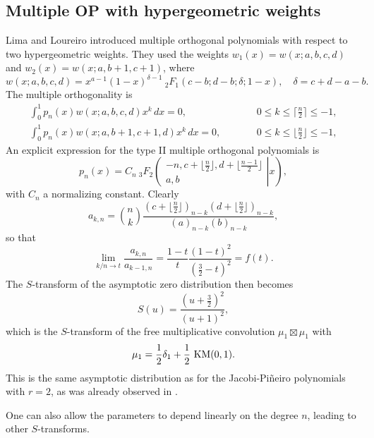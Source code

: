 \documentclass[12pt]{article}
\numberwithin{equation}{section}
\begin{document}
\subsection{Multiple OP with hypergeometric weights}
Lima and Loureiro \cite{Lima-Loureiro22} introduced multiple orthogonal polynomials with respect to two  hypergeometric weights.
They used the weights $w_1(x)=w(x;a,b,c,d)$ and $w_2(x)= w(x;a,b+1,c+1)$, where
\[    w(x;a,b,c,d) = x^{a-1}(1-x)^{\delta-1} \ {}_2F_1(c-b;d-b;\delta;1-x), \quad  \delta=c+d-a-b.   \]
The multiple orthogonality is
\begin{eqnarray*}
  \int_0^1 p_n(x) w(x;a,b,c,d) x^k\, dx = 0, &&  \qquad 0 \leq k \leq \lceil \frac{n}2  \rceil \leq -1, \\
   \int_0^1 p_n(x) w(x;a,b+1,c+1,d) x^k\, dx = 0, &&  \qquad 0 \leq k \leq \lfloor \frac{n}2  \rfloor \leq -1,
\end{eqnarray*}
An explicit expression for the type II multiple orthogonal polynomials is
\[  p_n(x) = C_n \ {}_3F_2 \left( \left. \begin{array}{c} -n, c+ \lfloor \frac{n}{2} \rfloor, d+ \lfloor \frac{n-1}{2} \rfloor \\
                                                                                  a, b   \end{array}  \right| x \right) ,  \]
with $C_n$ a normalizing constant. Clearly
\[    a_{k,n} = \binom{n}{k} \frac{(c+\lfloor \frac{n}2 \rfloor)_{n-k} (d+\lfloor \frac{n}2 \rfloor)_{n-k}}{(a)_{n-k} (b)_{n-k}}, \]
so that
\[   \lim_{k/n \to t} \frac{a_{k,n}}{a_{k-1,n}} = \frac{1-t}{t} \frac{(1-t)^2}{(\frac32-t)^2} = f(t). \]
The $S$-transform of the asymptotic zero distribution then becomes
\[      S(u) = \frac{(u+\frac32)^2}{(u+1)^2},   \]
which is the $S$-transform of the free multiplicative convolution  $\mu_1 \boxtimes \mu_1$ with
\begin{equation}   \label{mu1}
       \mu_1 = \frac12 \delta_1 + \frac12\   \textup{KM}(0, 1).  
\end{equation}
This is the same asymptotic distribution as for the Jacobi-Pi\~neiro polynomials with $r=2$, as was already observed in \cite[\S 3.4]{Lima-Loureiro22}.

One can also allow the parameters to depend linearly on the degree $n$, leading to other $S$-transforms.
\end{document}
